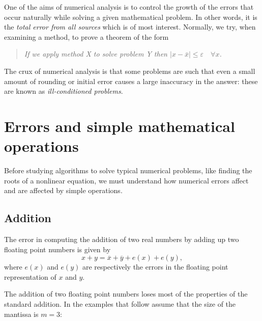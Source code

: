 \medskip

One of the aims of numerical analysis is to control the growth of the
errors that occur naturally while solving a given mathematical
problem.     In other words, it is the \textit{total error from all
sources} which is of most interest.   Normally, we try, when examining
a method, to prove a theorem of the form

\begin{quotation}
  \textit{If we apply method X to solve problem Y then $ | x - \bar x | \le \varepsilon \quad \forall x$.}
\end{quotation}

The crux of numerical analysis is that some problems are such that
even a small amount of rounding or initial error causes a large
inaccuracy in the answer: these are known as \textit{ill-conditioned
problems}. 

\section{Errors and simple mathematical operations}

Before studying algorithms to solve typical numerical problems, like
finding the roots of a nonlinear equation, we must understand how
numerical errors affect and are affected by simple operations.

\subsection{Addition}

The error in computing the addition of two real numbers by adding up
two floating point numbers is given by
%
\begin{equation*}
  x + y = \overline{x} + \overline{y} + e(x) + e(y),
\end{equation*}
%
where $e(x)$ and $e(y)$ are respectively the errors in the floating
point representation of $x$ and $y$.

The addition of two floating point numbers loses most of the
properties of the standard addition.   In the examples that follow
assume that the size of the mantissa is $m=3$:

